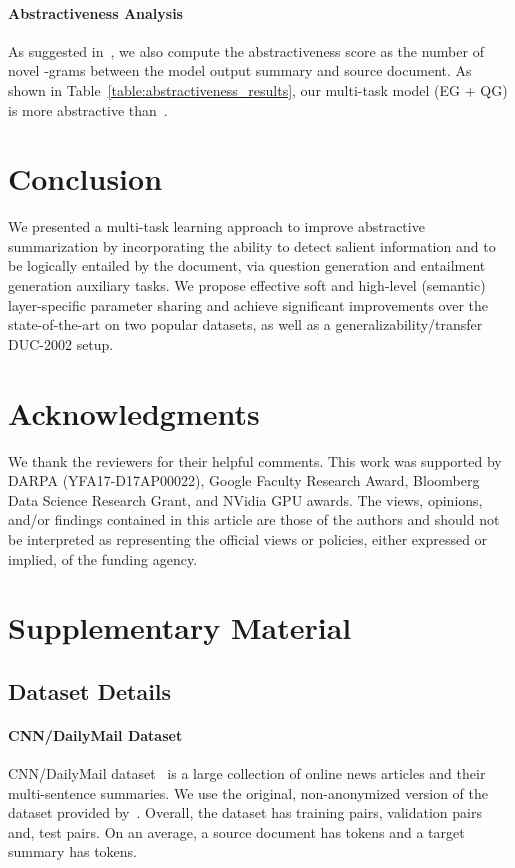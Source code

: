 \documentclass[11pt,a4paper]{article}
\begin{document}
\paragraph{Abstractiveness Analysis}
As suggested in~\citet{see2017get}, we also compute the abstractiveness score as the number of novel -grams between the model output summary and source document. As shown in Table~\ref{table:abstractiveness_results}, our multi-task model (EG + QG) is more abstractive than~\citet{see2017get}. 



 
\section{Conclusion}
We presented a multi-task learning approach to improve abstractive summarization by incorporating the ability to detect salient information and to be logically entailed by the document, via question generation and entailment generation auxiliary tasks. We propose effective soft and high-level (semantic) layer-specific parameter sharing and achieve significant improvements over the state-of-the-art on two popular datasets, as well as a generalizability/transfer DUC-2002 setup. 

\section*{Acknowledgments}
We thank the reviewers for their helpful comments. This work was supported by DARPA (YFA17-D17AP00022), Google Faculty Research Award, Bloomberg Data Science Research Grant, and NVidia GPU awards. The views, opinions, and/or findings contained in this article are those of the authors and should not be interpreted as representing the official views or policies, either expressed or implied, of the funding agency.




\appendix

\section{Supplementary Material}

\subsection{Dataset Details}
\label{sec:datasetsapp}
\paragraph{CNN/DailyMail Dataset}
CNN/DailyMail dataset~\cite{hermann2015teaching,nallapati2016abstractive} is a large collection of online news articles and their multi-sentence summaries. We use the original, non-anonymized version of the dataset provided by~. Overall, the dataset has  training pairs,  validation pairs and,  test pairs. On an average, a source document has  tokens and a target summary has  tokens.
\end{document}
